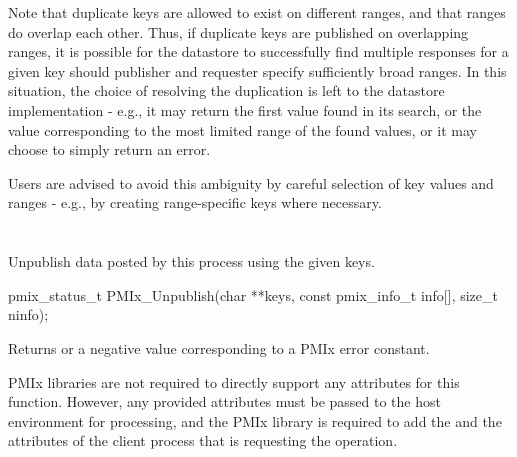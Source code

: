 \adviceuserstart
Note that duplicate keys are allowed to exist on different ranges, and that ranges do overlap each other. Thus, if duplicate keys are published on overlapping ranges, it is possible for the datastore to successfully find multiple responses for a given key should publisher and requester specify sufficiently broad ranges. In this situation, the choice of resolving the duplication is left to the datastore implementation - e.g., it may return the first value found in its search, or the value corresponding to the most limited range of the found values, or it may choose to simply return an error.

Users are advised to avoid this ambiguity by careful selection of key values and ranges - e.g., by creating range-specific keys where necessary.
\adviceuserend


\section{}

\summary

Unpublish data posted by this process using the given keys.

\format

\cspecificstart
\begin{codepar}
pmix_status_t
PMIx_Unpublish(char **keys,
               const pmix_info_t info[], size_t ninfo);
\end{codepar}
\cspecificend

\begin{arglist}
\end{arglist}

Returns  or a negative value corresponding to a PMIx error constant.

\reqattrstart
\ac{PMIx} libraries are not required to directly support any attributes for this function. However, any provided attributes must be passed to the host environment for processing, and the \ac{PMIx} library is required to add the  and the  attributes of the client process that is requesting the operation.

